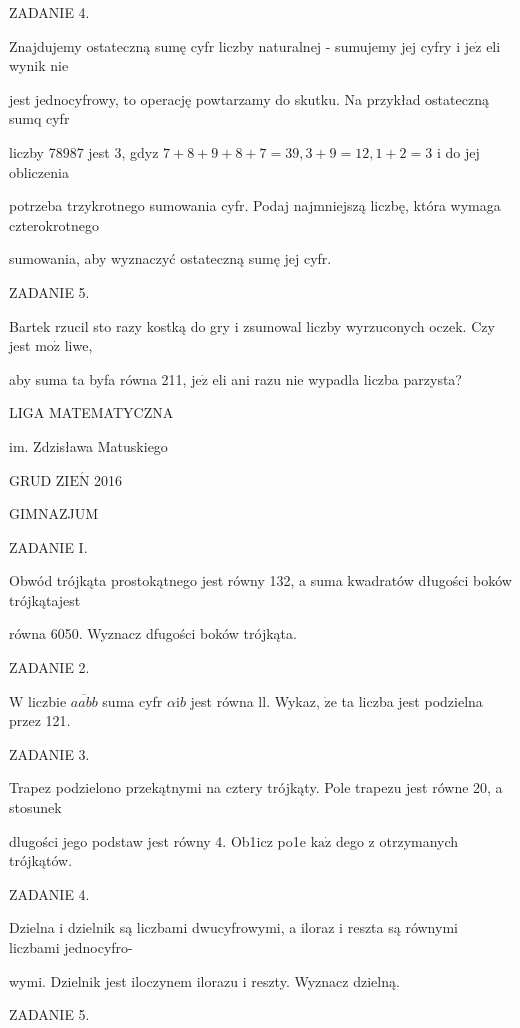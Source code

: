 \documentclass[a4paper,12pt]{article}
\begin{document}
ZADANIE 4.

Znajdujemy ostateczną sumę cyfr liczby naturalnej - sumujemy jej cyfry i $\mathrm{j}\mathrm{e}\dot{\mathrm{z}}$ eli wynik nie

jest jednocyfrowy, to operację powtarzamy do skutku. Na przykład ostateczną sumq cyfr

liczby 78987 jest 3, gdyz $7+8+9+8+7= 39, 3+9 = 12, 1+2 = 3$ i do jej obliczenia

potrzeba trzykrotnego sumowania cyfr. Podaj najmniejszą liczbę, która wymaga czterokrotnego

sumowania, aby wyznaczyć ostateczną sumę jej cyfr.

ZADANIE 5.

Bartek rzucil sto razy kostką do gry i zsumowal liczby wyrzuconych oczek. Czy jest $\mathrm{m}\mathrm{o}\dot{\mathrm{z}}$ liwe,

aby suma ta byfa równa 211, $\mathrm{j}\mathrm{e}\dot{\mathrm{z}}$ eli ani razu nie wypadla liczba parzysta?






LIGA MATEMATYCZNA

im. Zdzisława Matuskiego

GRUD Z$\mathrm{I}\mathrm{E}\acute{\mathrm{N}}$ 2016

GIMNAZJUM

ZADANIE I.

Obwód trójkąta prostokątnego jest równy 132, a suma kwadratów długości boków trójkątajest

równa 6050. Wyznacz dfugości boków trójkąta.

ZADANIE 2.

$\mathrm{W}$ liczbie $\overline{aabb}$ suma cyfr $\alpha \mathrm{i}b$ jest równa ll. Wykaz, $\dot{\mathrm{z}}\mathrm{e}$ ta liczba jest podzielna przez 121.

ZADANIE 3.

Trapez podzielono przekątnymi na cztery trójkąty. Pole trapezu jest równe 20, a stosunek

dlugości jego podstaw jest równy 4. Ob1icz po1e $\mathrm{k}\mathrm{a}\dot{\mathrm{z}}$ dego z otrzymanych trójkątów.

ZADANIE 4.

Dzielna i dzielnik są liczbami dwucyfrowymi, a iloraz i reszta są równymi liczbami jednocyfro-

wymi. Dzielnik jest iloczynem ilorazu i reszty. Wyznacz dzielną.

ZADANIE 5.
\end{document}
